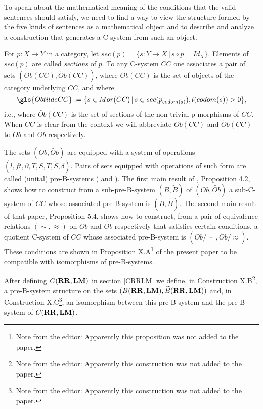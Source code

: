 \documentclass[onecolumn,12pt]{amsart}
\numberwithin{proposition}{subsection}
\newcommand{\sr}{\rightarrow}
\newcommand{\wt}{\widetilde}
\newcommand{\RR}{{\bf RR}}
\newcommand{\LM}{{\bf LM}}
\newcommand{\editorfootnote}[1]{\footnote{Note from the editor: #1}}
\begin{document}
To speak about the mathematical meaning of the conditions that the valid sentences should satisfy, we need to find a way to view the structure formed by the five kinds of sentences as a mathematical object and to describe and analyze a construction that generates a C-system from such an object.





For $p:X\sr Y$ in a category, let $sec(p)=\{s:Y\sr X\,|\,s\circ p=Id_X\}$. 
Elements of $sec(p)$ are called {\em sections} of $p$. To any C-system
$CC$ one associates a pair of sets $(Ob(CC),\wt{Ob}(CC))$, where $Ob(CC)$ is the
set of objects of the category underlying $CC$, and where
%
\begin{equation}
\label{2017.02.04.eq1}
\gls{ObtildeCC}:=\{s\in Mor(CC)\,|\,s\in sec(p_{codom(s)}), l(codom(s))>0\},
\end{equation}%
%
i.e., where $\wt{Ob}(CC)$ is the set of sections of the non-trivial
p-morphisms of $CC$. When $CC$ is clear from the context we will abbreviate
$Ob(CC)$ and $\wt{Ob}(CC)$ to $Ob$ and $\wt{Ob}$ respectively.





The sets $(Ob,\wt{Ob})$ are equipped with a system of operations
$(l,ft,\partial,T,S,\wt{T},\wt{S},\delta)$. Pairs of sets equipped with
operations of such form are called (unital) pre-B-systems (\cite[2.2]{Bsystems} and \cite[2.5]{Bsystemsnew}).
The first main result of \cite{Csubsystems},
Proposition 4.2, shows how to construct from a sub-pre-B-system $(B,\wt{B})$ of
$(Ob,\wt{Ob})$ a sub-C-system of $CC$ whose associated pre-B-system is
$(B,\wt{B})$. The second main result of that paper, Proposition 5.4, shows how
to construct, from a pair of equivalence relations $(\sim,\approx)$ on $Ob$ and
$\wt{Ob}$ respectively that satisfies certain conditions, a quotient C-system
of $CC$ whose associated pre-B-system is $(Ob/{\sim},\wt{Ob}/\approx)$. These
conditions are shown in Proposition X.A\editorfootnote{Apparently this proposition was not added to the paper.} of the present paper to be
compatible with isomorphisms of pre-B-systems.

After defining $C(\RR,\LM)$ in section \ref{CRRLM}
we define, in Construction X.B\editorfootnote{Apparently this construction was not added to the paper.}, a pre-B-system structure on the sets
$(B(\RR,\LM),\wt{B}(\RR,\LM))$ and, in Construction X.C\editorfootnote{Apparently this construction was not added to the paper.}, an isomorphism
between this pre-B-system and the pre-B-system of $C(\RR,\LM)$.
\end{document}
